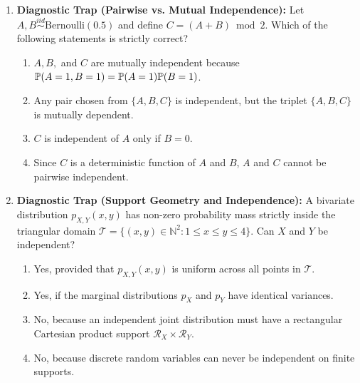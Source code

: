 \begin{enumerate}[resume]
\item \textbf{Diagnostic Trap (Pairwise vs. Mutual Independence):}
Let $A, B \stackrel{iid}{\sim} \text{Bernoulli}(0.5)$ and define $C = (A + B) \bmod 2$. Which of the following statements is strictly correct?
\begin{enumerate}
    \item $A, B,$ and $C$ are mutually independent because $\P(A=1, B=1) = \P(A=1)\P(B=1)$.
    \item Any pair chosen from $\{A, B, C\}$ is independent, but the triplet $\{A, B, C\}$ is mutually dependent.
    \item $C$ is independent of $A$ only if $B = 0$.
    \item Since $C$ is a deterministic function of $A$ and $B$, $A$ and $C$ cannot be pairwise independent.
\end{enumerate}

\item \textbf{Diagnostic Trap (Support Geometry and Independence):}
A bivariate distribution $p_{X,Y}(x, y)$ has non-zero probability mass strictly inside the triangular domain $\mathcal{T} = \{(x, y) \in \mathbb{N}^2 \colon 1 \le x \le y \le 4\}$. Can $X$ and $Y$ be independent?
\begin{enumerate}
    \item Yes, provided that $p_{X,Y}(x, y)$ is uniform across all points in $\mathcal{T}$.
    \item Yes, if the marginal distributions $p_X$ and $p_Y$ have identical variances.
    \item No, because an independent joint distribution must have a rectangular Cartesian product support $\mathcal{R}_X \times \mathcal{R}_Y$.
    \item No, because discrete random variables can never be independent on finite supports.
\end{enumerate}
\end{enumerate}
